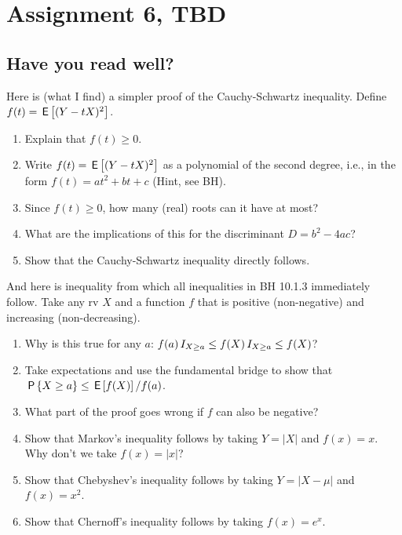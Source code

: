 \documentclass[assignments]{subfiles}
\begin{document}
\section{Assignment 6, TBD}


\subsection{Have you read well?}

\begin{exercise}
Here is (what I find) a simpler proof of the Cauchy-Schwartz inequality.  Define  $f(t) = \,\mathsf{E}\left[(Y-tX)^2\right]$.
\begin{enumerate}
\item Explain that $f(t)\geq 0$.
\item Write $f(t) = \,\mathsf{E}\left[(Y-tX)^2\right]$ as a polynomial of the second degree, i.e., in the form $f(t) = a t^2 + b t + c$ (Hint, see BH).
\item Since $f(t) \geq 0$, how many (real) roots can it have at most?
\item What are the implications of this for the discriminant $D=b^2-4ac$?
\item Show that the Cauchy-Schwartz inequality directly follows.
\end{enumerate}
\end{exercise}

\begin{exercise}
And here is inequality from which all inequalities in BH 10.1.3 immediately follow.
Take any rv $X$ and a function $f$ that is positive (non-negative) and  increasing (non-decreasing).
\begin{enumerate}
\item Why is this true for any $a$: $f(a) \,I_{X\geq a} \leq f(X) \,I_{X\geq a} \leq f(X)$?
\item Take expectations and use the fundamental bridge to show that $\,\mathsf{P}\left\{X\geq a\right\} \leq \,\mathsf{E}\left[f(X)\right]/f(a)$.
\item What part of the proof goes wrong if  $f$ can also be negative?
\item Show that Markov's inequality follows by taking $Y=|X|$ and  $f(x)=x$. Why don't we take $f(x) = |x|$?
\item Show that Chebyshev's inequality follows by taking $Y=|X-\mu|$ and $f(x)=x^2$.
\item Show that Chernoff's inequality follows by taking $f(x)=e^{x}$.
\end{enumerate}
\end{exercise}
\end{document}
